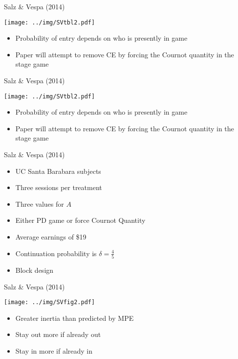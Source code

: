 \documentclass{beamer}
\begin{document}
\begin{frame}{Salz \& Vespa (2014) }
\begin{center}
	\texttt{[image: ../img/SVtbl2.pdf]}
\end{center}
	\begin{itemize}
		\item Probability of entry depends on who is presently in game
		\item Paper will attempt to remove CE by forcing the Cournot quantity in the stage game
	\end{itemize}
\end{frame}


\begin{frame}{Salz \& Vespa (2014) }
\begin{center}
	\texttt{[image: ../img/SVtbl2.pdf]}
\end{center}
	\begin{itemize}
		\item Probability of entry depends on who is presently in game
		\item Paper will attempt to remove CE by forcing the Cournot quantity in the stage game
	\end{itemize}
\end{frame}

\begin{frame}{Salz \& Vespa (2014) }
	\begin{itemize}
		\item UC Santa Barabara subjects
		\item Three sessions per treatment
		\item Three values for $A$
		\item Either PD game or force Cournot Quantity
		\item Average earnings of \$19
		\item Continuation probability is $\delta=\tfrac{4}{5}$
		\item Block design
	\end{itemize}
\end{frame}

\begin{frame}{Salz \& Vespa (2014) }
	\begin{center}
		\texttt{[image: ../img/SVfig2.pdf]}
	\end{center}

	\begin{itemize}
		\item Greater inertia than predicted by MPE
		\item Stay out more if already out
		\item Stay in more if already in
	\end{itemize}

\end{frame}
\end{document}
